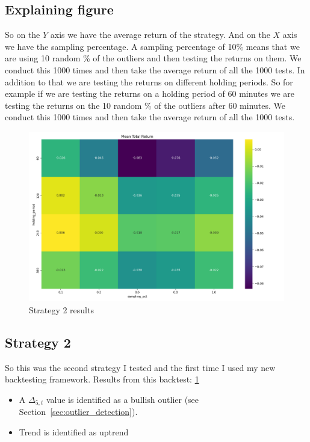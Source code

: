 \documentclass[12pt]{article}
\begin{document}
\newpage

\subsection{Explaining figure}
So on the $Y$ axis we have the average return of the strategy. And on the $X$ axis we have the sampling percentage. 
A sampling percentage of 10\% means that we are using 10 random \% of the outliers and then testing the returns on them. We conduct this 1000 times and then take the average return of all the 1000 tests. In addition to that we are testing the returns on different holding periods. So for example if we are testing the returns on a holding period of 60 minutes we are testing the returns on the 10 random \% of the outliers after 60 minutes. We conduct this 1000 times and then take the average return of all the 1000 tests.




\begin{figure}[H]
  \centering
  \includegraphics[width=\textwidth]{imgs/Bullish_outliers_inside_of_uptrend.png}
  \caption{Strategy 2 results}
  \label{fig:bullish_outliers_inside_of_uptrend}
\end{figure}


\subsection{Strategy 2}

So this was the second strategy I tested and the first time I used my new backtesting framework. 
Results from this backtest: \ref{fig:bullish_outliers_inside_of_uptrend}

\begin{itemize}
  \item  A $\Delta_{5,t}$ value is identified as a bullish outlier (see Section~\ref{sec:outlier_detection}).
  \item Trend is identified as uptrend
\end{itemize}
\end{document}
